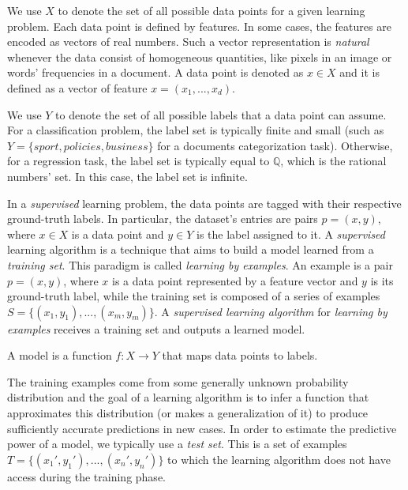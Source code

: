 \begin{definition}
	We use $X$ to denote the set of all possible data points for a given learning problem. Each data point is defined by features. In some cases, the features are encoded as vectors of real numbers. Such a vector representation is \textit{natural} whenever the data consist of homogeneous quantities, like pixels in an image or words' frequencies in a document. A data point is denoted as $x \in X$ and it is defined as a vector of feature $x = (x_1, ..., x_d)$.
\end{definition}

\begin{definition}
	We use $Y$ to denote the set of all possible labels that a data point can assume. For a classification problem, the label set is typically finite and small (such as $Y = \{sport, policies, business\}$ for a documents categorization task). Otherwise, for a regression task, the label set is typically equal to $\mathbb{Q}$, which is the rational numbers' set. In this case, the label set is infinite.
\end{definition}

In a \textit{supervised} learning problem, the data points are tagged with their respective ground-truth labels. In particular, the dataset's entries are pairs $p = (x, y)$, where $x \in X$ is a data point and $y \in Y$ is the label assigned to it. A \textit{supervised} learning algorithm is a technique that aims to build a model learned from a \textit{training set}. This paradigm is called \textit{learning by examples}. An example is a pair $p=(x, y)$, where $x$ is a data point represented by a feature vector and $y$ is its ground-truth label, while the training set is composed of a series of examples $S=\{(x_1, y_1), ..., (x_m, y_m)\}$. A \textit{supervised learning algorithm} for \textit{learning by examples} receives a training set and outputs a learned model.

\begin{definition}[Model]
	A model is a function $f:X \to Y$ that maps data points to labels.
\end{definition}

The training examples come from some generally unknown probability distribution and the goal of a learning algorithm is to infer a function that approximates this distribution (or makes a generalization of it) to produce sufficiently accurate predictions in new cases. In order to estimate the predictive power of a model, we typically use a \textit{test set}. This is a set of examples $T=\{(x_1', y_1'), ..., (x_n', y_n')\}$ to which the learning algorithm does not have access during the training phase. 

